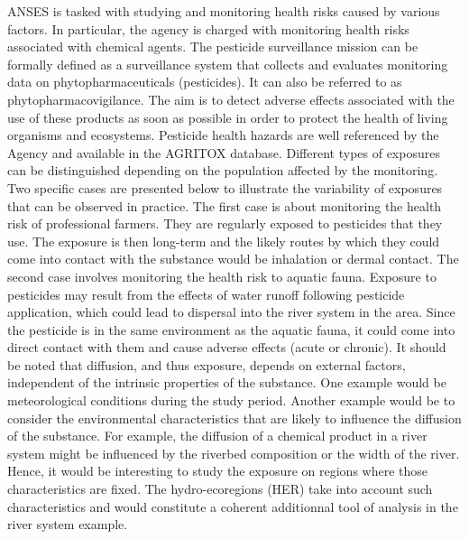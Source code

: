 ANSES is tasked with studying and monitoring health risks caused by various factors. In particular, the agency is charged with monitoring health risks associated with chemical agents. The pesticide surveillance mission can be formally defined as a surveillance system that collects and evaluates monitoring data on phytopharmaceuticals (pesticides). It can also be referred to as phytopharmacovigilance. The aim is to detect adverse effects associated with the use of these products as soon as possible in order to protect the health of living organisms and ecosystems. Pesticide health hazards are well referenced by the Agency and available in the AGRITOX database. Different types of exposures can be distinguished depending on the population affected by the monitoring. Two specific cases are presented below to illustrate the variability of exposures that can be observed in practice. The first case is about monitoring the health risk of professional farmers. They are regularly exposed to pesticides that they use. The exposure is then long-term and the likely routes by which they could come into contact with the substance would be inhalation or dermal contact. The second case involves monitoring the health risk to aquatic fauna. Exposure to pesticides may result from the effects of water runoff following pesticide application, which could lead to dispersal into the river system in the area. Since the pesticide is in the same environment as the aquatic fauna, it could come into direct contact with them and cause adverse effects (acute or chronic). It should be noted that diffusion, and thus exposure, depends on external factors, independent of the intrinsic properties of the substance. One example would be meteorological conditions during the study period. Another example would be to consider the environmental characteristics that are likely to influence the diffusion of the substance. For example, the diffusion of a chemical product in a river system might be influenced by the riverbed composition or the width of the river. Hence, it would be interesting to study the exposure on regions where those characteristics are fixed. The hydro-ecoregions (HER) take into account such characteristics and would constitute a coherent additionnal tool of analysis in the river system example.           

